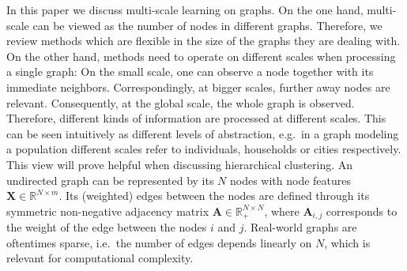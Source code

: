 \documentclass{article}
\begin{document}
 In this paper we discuss multi-scale learning on graphs. 
 On the one hand, multi-scale can be viewed as the number of nodes in different graphs. Therefore, we review methods %
 which are flexible in the size of the graphs they are dealing with. On the other hand, methods need to operate on different scales when processing a single graph: On the small scale, one can observe a node together with its immediate neighbors. Correspondingly, at bigger scales, further away nodes are relevant. Consequently, at the global scale, the whole graph is observed. Therefore, different kinds of information are processed at different scales. This can be seen intuitively as different levels of abstraction, e.g.\ in a graph modeling a population different scales refer to individuals, households or cities respectively. This view will prove helpful when discussing hierarchical clustering.
 An undirected graph can be represented by its $N$ nodes with node features $\mathbf{X}\in \mathbb{R}^{N\times m}$. %
 Its (weighted) edges between the nodes are defined through its symmetric non-negative adjacency matrix $\mathbf{A}\in \mathbb{R}_+^{N\times N}$, where $\mathbf{A}_{i,j}$ corresponds to the weight of the edge between the nodes $i$ and $j$. Real-world graphs are oftentimes sparse, i.e.\ the number of edges depends linearly on $N$, which is relevant for computational complexity.


\end{document}
